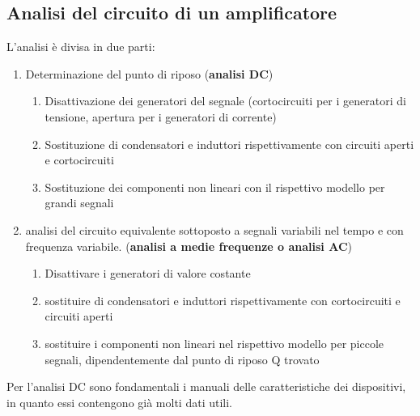 \documentclass[11pt,a4paper,]{article}
\begin{document}
\subsection{Analisi del circuito di un amplificatore}
L'analisi è divisa in due parti:
\begin{enumerate}
    \item Determinazione del punto di riposo (\textbf{analisi DC})
    \begin{enumerate}
        \item Disattivazione dei generatori del segnale (cortocircuiti per i generatori di tensione, apertura per i generatori di corrente)
        \item Sostituzione di condensatori e induttori rispettivamente con circuiti aperti e cortocircuiti
        \item Sostituzione dei componenti non lineari con il rispettivo modello per grandi segnali
    \end{enumerate}
    \item analisi del circuito equivalente sottoposto a segnali variabili nel tempo e con frequenza variabile. (\textbf{analisi a medie frequenze o analisi AC})
    \begin{enumerate}
        \item Disattivare i generatori di valore costante
        \item sostituire di condensatori e induttori rispettivamente con cortocircuiti e circuiti aperti
        \item sostituire i componenti non lineari nel rispettivo modello per piccole segnali, dipendentemente dal punto di riposo Q trovato
    \end{enumerate}
\end{enumerate}
\begin{nota}
    Per l'analisi DC sono fondamentali i manuali delle caratteristiche dei dispositivi, in quanto essi contengono già molti dati utili.
\end{nota}
\end{document}
